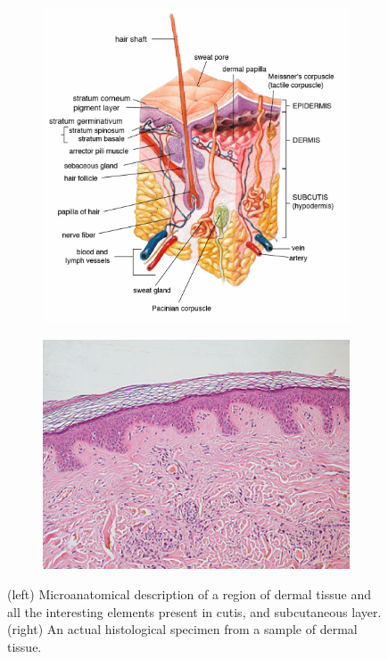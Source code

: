 \documentclass[12pt,a4paper]{report}
\begin{document}
    \begin{figure}
        \centering
        \begin{subfigure}[b]{0.45\textwidth}
             \centering
             \includegraphics[width = \textwidth]{images/derm_scheme}
             \caption{}
             \label{fig:derm_scheme}
        \end{subfigure}
        \hfill
        \begin{subfigure}[b]{0.45\textwidth}
             \centering
             \includegraphics[width = \textwidth]{images/derm_specimen}
             \caption{}
             \label{fig:derm_specimen}
        \end{subfigure}
        \caption{(left) Microanatomical description of a region of dermal tissue and all the interesting elements present in cutis, and subcutaneous layer. (right) An actual histological specimen from a sample of dermal tissue.}
        \label{fig:derm_descr}
    \end{figure}
\end{document}
